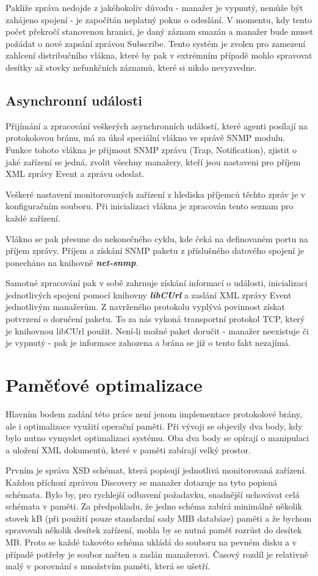 Pakliže zpráva nedojde z jakéhokoliv důvodu - manažer je vypnutý, nemůže být zahájeno spojení - je započítán neplatný pokus o odeslání. V momentu, kdy tento počet
překročí stanovenou hranici, je daný záznam smazán a manažer bude muset požádat o nové zapsání zprávou Subscribe. Tento systém je zvolen pro zamezení zahlcení 
distribučního vlákna, které by pak v extrémním případě mohlo spravovat desítky až stovky nefunkčních záznamů, které si nikdo nevyzvedne.


\subsection{Asynchronní události}
Přijímání a zpracování veškerých asynchronních událostí, které agenti posílají na protokolovou bránu, má za úkol speciální vlákno ve správě SNMP modulu.
Funkce tohoto vlákna je přijmout SNMP zprávu (Trap, Notification), zjistit o jaké zařízení se jedná, zvolit všechny manažery, kteří jsou nastaveni pro příjem
XML zprávy Event a zprávu odeslat.

Veškeré nastavení monitorovaných zařízení z hlediska příjemců těchto zpráv je v konfiguračním souboru. Při inicializaci vlákna je zpracován tento seznam pro každé
zařízení.

Vlákno se pak přesune do nekonečného cyklu, kde čeká na definovaném portu na příjem zprávy. Příjem a získání SNMP paketu z příslušného datového spojení je ponecháno
na knihovně \textbf{\textit{net-snmp}}.

Samotné zpracování pak v sobě zahrnuje získání informací o události, inicializaci jednotlivých spojení pomocí knihovny \textbf{\textit{libCUrl}} a zaslání XML zprávy
Event jednotlivým manažerům. Z navrženého protokolu vyplývá povinnost získat potvrzení o doručení paketu. To za nás vykoná transportní protokol TCP, který je knihovnou libCUrl
použit. Není-li možné paket doručit - manažer neexistuje či je vypnutý - pak je informace zahozena a brána se již o tento fakt nezajímá.


\section{Paměťové optimalizace}
Hlavním bodem zadání této práce není jenom implementace protokolové brány, ale i optimalizace využití operační paměti. Při vývoji se objevily dva body, kdy bylo nutno 
vymyslet optimalizaci systému. Oba dva body se opírají o manipulaci a uložení XML dokumentů, které v paměti zabírají velký prostor.

Prvním je správa XSD schémat, která popisují jednotlivá monitorovaná zařízení. Každou příchozí zprávou Discovery se manažer dotazuje na tyto popisná schémata. Bylo by, pro 
rychlejší odbavení požadavku, snadnější uchovávat celá schémata v paměti. Za předpokladu, že jedno schéma zabírá minimálně několik stovek kB (při použití pouze standardní
sady MIB databáze) paměti a že bychom spravovali několik desítek zařízení, mohla by se nutná paměť rozrůst do desítek MB. Proto se každé takovéto schéma ukládá do
souboru na pevném disku a v případě potřeby je soubor načten a zaslán manažerovi. Časový rozdíl je relativně malý v porovnání s množstvím paměti, která se ušetří.

